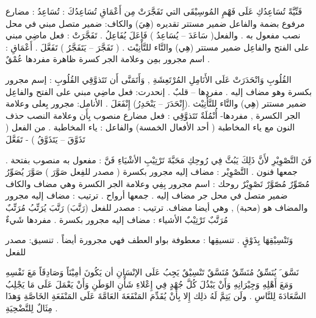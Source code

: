 \documentclass[a4paper]{article}
\begin{document}
\begin{flushright}
فَنِّيَّةً تُسَاعِدُكِ عَلَى فَهْمِ المُوسِيْقَى التي تَفَجَّرَتْ مِن أَعْمَاقِ
تُسَاعِدُكَ : تُسَاعِدُ : مضارع مرفوع بضمة والفاعل ضمير مستتر تقديره (هِيَ) والكاف: ضمير متصل مبني في محل نصب مفعول به . والفعل( سَاعَدَ – يُسَاعِدُ ) فَاعَلَ يُفَاعِلُ .
تَفَجَّرَتْ : فعل ماضِي مبني على الفتح  والفاعِل ضمير مستتر (هِي)
            والتَّاء للتَّأْنِيْث . ( تَفَجَّرَ – يَتَفَجَّرُ ) تَفَعَّلَ .
أَعْمَاقِ : اسم مجرور بمِن وعلامة الجر كسرة ظاهرة
          مفردها عُمْقٌ .
 
القُلُوبِ وَانْحَدَرَتْ عَلَى الأَنَامِلِ المُرْتَعِشَةِ , وَأَتَمَنَّى أَن تَتَذوَّقِي
القُلُوبِ : إسم مجرور بكسرة وهو مضاف إليه . مفردها – قلبٌ .
إنحدرت: فعل ماضِي مبني على الفتح  والفاعِل ضمير مستتر (هِي)
            والتَّاء للتَّأْنِيْث .(إِنْحَدَرَ – يَنْحَدِرُ) إِنْفَعَلَ .
الأنامل: مجرور بِعلى وعلامة الجر الكسرة , مفردها- أُنْمُلَةٌ
تَتَذوَّقِي : فعل مضارع منصوب بِأَن وعلامة النصب حذف النون مع ياء
      المخاطبة ( أحد الأفعال الخمسة) والفاعل : ياء المخاطبة .
      من الفعل ( تَذَوَّقَ – يَتَذَوَّقُ ) - تَفَعَّلَ
 
فَنَ التَّصْوِيْرِ لأَنَّ ذَلِكَ يَبُثَّ فِي رُوحِكِ مَحَبَّةَ تَرْتِيْبِ الأشْيَاءِ
فَنَّ : مفعول به منصوب بفتحة . جمعها فنون .
التَّصْوِيْر : مضاف إليه مجرور بكسرة ( مصدر للفِعل صَوَّرَ )
      صَوَّرَ  يُصَوِّرُ  مُصّوِّرٌ  مُصّوَّرٌ  تَصْوِيْرٌ
روحك : اسم مجرور بِفِي وعلامة الجر الكسرة وهي مضاف والكاف     
      ضمير متصل في محل جر مضاف إليه . جمعها أرواح .
ترتيب : مضاف إليه مجرور والمضاف هو (محبة) , وهي أيضا مضاف.
      ترتيب : مصدر للفعل (رَتَّبَ) رَتَّبَ يُرَتِّبُ مُرَتِّبٌ مُرَتَّبٌ تَرْتِيْبٌ
الأشياء : مضاف إليه مجرور بكسرة . مفردها شَيءٌ
 
وَتَنْسِيْقِهَا بِذَوْقٍ .
تنسيقِها : معطوفة بواو العطف فهي مجرورة أيضاً . تنسيق: مصدر للفعل
 
          نَسَّق َ يُنَسِّقُ  مُنَسِّقٌ  مُنَسَّقٌ  تَنْسِيْقٌ
يَجِبُ عَلَى الإنْسَانِ أن يَكُونَ أمِيْنَاً وَصَادِقَاً مَعَ نَفْسِهِ وَمَعَ أَهْلِهِ وَجِيْرَانِهِ وَأَنْ يَبْذُلَ كُلَّ جُهْدٍ فِي إِعْلاءِ شَأْنِ الوَطَنِ وَأَنْ يَعْمَلَ عَلَى مَا يَجْلِبُ السَّعَادَةَ لِلنَّاسِ . ولَن يَتِمَّ لَهُ ذلِك إِلا بِأَنْ يُقَدِّمَ المَنْفَعَةَ العَامَّةَ عَلَى المَنْفَعَةِ الخَاصَّةِ وَهذَا مِثَالٌ لِلتَّضْحِيَةِ .
 


\end{flushright}
\end{document}
